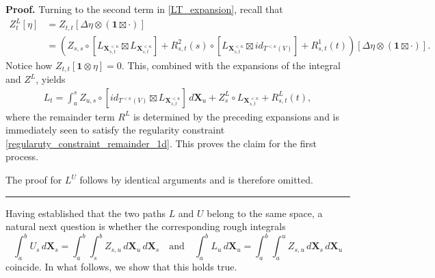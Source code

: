 \documentclass{article}%
\newenvironment{proof}[1][Proof]{\noindent\textbf{#1.} }{\ \rule{0.5em}{0.5em}}
\begin{document}
\begin{proof}
Turning to the second term in \eqref{LT_expansion}, recall that
\begin{align*}
Z_t^L[\eta]
&= Z_{t,t}
\left[\Delta \eta \otimes (\mathbf{1} \boxtimes \cdot) \right] \\
&=
\left(
Z_{s,s} \circ
\left[ L_{\mathbf{X}_{s,t}^{<\kappa}} \boxtimes
L_{\mathbf{X}_{s,t}^{<\kappa}} \right]
+ R^2_{s,t}(s) \circ
\left[ L_{\mathbf{X}_{s,t}^{<\kappa}} \boxtimes id_{T^{<\kappa}(V)} \right]
+ R^1_{s,t}(t)
\right)
\left[\Delta \eta \otimes (\mathbf{1} \boxtimes \cdot) \right].
\end{align*}
Notice how $Z_{t,t}[\mathbf{1} \otimes \eta] =0$. This, combined with the expansions of the integral and $Z^L$, yields
\begin{align*}
L_t
= \int_a^s Z_{u,s} \circ
\left[ id_{T^{<\kappa}(V)} \boxtimes L_{\mathbf{X}_{s,t}^{<\kappa}} \right]
\, d\mathbf{X}_u
+ Z_{s}^L \circ
 L_{\mathbf{X}_{s,t}^{<\kappa}} 
+ R^L_{s,t}(t),
\end{align*}
where the remainder term $R^L$ is determined by the preceding expansions and is immediately seen to satisfy the regularity constraint \eqref{regularuty_constraint_remainder_1d}. This proves the claim for the first process.

The proof for $L^U$ follows by identical arguments and is therefore omitted.
\end{proof}

Having established that the two paths $L$ and $U$ belong to the same space, a natural next question is whether the corresponding rough integrals
\[
\int_a^b U_s \, d\mathbf{X}_s = \int_a^b \int_s^b Z_{s, u}\, d\mathbf{X}_u \, d\mathbf{X}_s
\quad \text{and} \quad
\int_a^b L_u \, d\mathbf{X}_u = \int_a^b \int_a^u Z_{s, u}\, d\mathbf{X}_s \, d\mathbf{X}_u
\]
coincide. In what follows, we show that this holds true.
\end{document}
